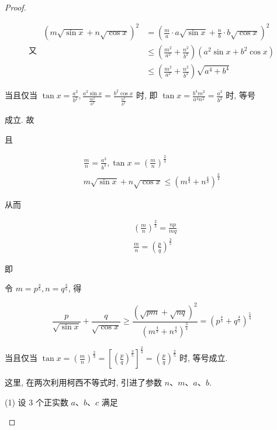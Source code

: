 \begin{proof}
\begin{example}
\begin{solution}
\begin{note}
\begin{solution}
\begin{solution}
	$$
	\text { 又 } \begin{aligned}
	(m \sqrt{\sin x}+n \sqrt{\cos x})^{2} & =\left(\frac{m}{a} \cdot a \sqrt{\sin x}+\frac{n}{b} \cdot b \sqrt{\cos x}\right)^{2} \\
	& \leqslant\left(\frac{m^{2}}{a^{2}}+\frac{n^{2}}{b^{2}}\right)\left(a^{2} \sin x+b^{2} \cos x\right) \\
	& \leqslant\left(\frac{m^{2}}{a^{2}}+\frac{n^{2}}{b^{2}}\right) \sqrt{a^{4}+b^{4}}
	\end{aligned}
	$$
	
	当且仅当 $\tan x=\frac{a^{2}}{b^{2}}, \frac{a^{2} \sin x}{\frac{m^{2}}{a^{2}}}=\frac{b^{2} \cos x}{\frac{n^{2}}{b^{2}}}$ 时, 即 $\tan x=\frac{b^{4} m^{2}}{a^{4} n^{2}}=\frac{a^{2}}{b^{2}}$ 时, 等号
	
	成立. 故
	
	且
	
	$$
	\begin{gathered}
	\frac{m}{n}=\frac{a^{3}}{b^{3}}, \tan x=\left(\frac{m}{n}\right)^{\frac{2}{3}} \\
	m \sqrt{\sin x}+n \sqrt{\cos x} \leqslant\left(m^{\frac{4}{3}}+n^{\frac{4}{3}}\right)^{\frac{3}{4}}
	\end{gathered}
	$$
	
	从而
	
	$$
	\begin{aligned}
	& \left(\frac{m}{n}\right)^{\frac{2}{3}}=\frac{n p}{m q} \\
	& \frac{m}{n}=\left(\frac{p}{q}\right)^{\frac{3}{5}}
	\end{aligned}
	$$
	
	即
	
	令 $m=p^{\frac{3}{5}}, n=q^{\frac{3}{5}}$, 得
	
	$$
	\frac{p}{\sqrt{\sin x}}+\frac{q}{\sqrt{\cos x}} \geqslant \frac{(\sqrt{p m}+\sqrt{n q})^{2}}{\left(m^{\frac{4}{3}}+n^{\frac{4}{3}}\right)^{\frac{3}{4}}}=\left(p^{\frac{4}{5}}+q^{\frac{4}{5}}\right)^{\frac{5}{4}}
	$$
	
	当且仅当 $\tan x=\left(\frac{m}{n}\right)^{\frac{2}{3}}=\left[\left(\frac{p}{q}\right)^{\frac{3}{5}}\right]^{\frac{2}{3}}=\left(\frac{p}{q}\right)^{\frac{2}{5}}$ 时, 等号成立.
\end{solution}
\begin{note}
	这里, 在两次利用柯西不等式时, 引进了参数 $n 、 m 、 a 、 b$.
\end{note}

\begin{example}
	(1) 设 3 个正实数 $a 、 b 、 c$ 满足
	

\end{example}
\end{solution}
\end{note}
\end{solution}
\end{example}
\end{proof}
